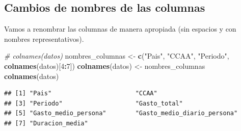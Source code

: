 \documentclass[data,article,submit,moreauthors,pdftex]{Definitions/mdpi}
\newenvironment{Shaded}{\begin{snugshade}}{\end{snugshade}}
\newcommand{\AttributeTok}[1]{\textcolor[rgb]{0.13,0.29,0.53}{#1}}
\newcommand{\CommentTok}[1]{\textcolor[rgb]{0.56,0.35,0.01}{\textit{#1}}}
\newcommand{\DecValTok}[1]{\textcolor[rgb]{0.00,0.00,0.81}{#1}}
\newcommand{\FunctionTok}[1]{\textcolor[rgb]{0.13,0.29,0.53}{\textbf{#1}}}
\newcommand{\NormalTok}[1]{#1}
\newcommand{\OtherTok}[1]{\textcolor[rgb]{0.56,0.35,0.01}{#1}}
\newcommand{\SpecialCharTok}[1]{\textcolor[rgb]{0.81,0.36,0.00}{\textbf{#1}}}
\newcommand{\StringTok}[1]{\textcolor[rgb]{0.31,0.60,0.02}{#1}}
\begin{document}
\begin{Shaded}
\end{Shaded}

\subsection{Cambios de nombres de las
columnas}\label{cambios-de-nombres-de-las-columnas}

Vamos a renombrar las columnas de manera apropiada (sin espacios y con
nombres representativos).

\begin{Shaded}
\begin{Highlighting}[]
\CommentTok{\# colnames(datos)}
\NormalTok{nombres\_columnas }\OtherTok{\textless{}{-}} \FunctionTok{c}\NormalTok{(}\StringTok{"Pais"}\NormalTok{, }\StringTok{"CCAA"}\NormalTok{, }\StringTok{"Periodo"}\NormalTok{, }\FunctionTok{colnames}\NormalTok{(datos)[}\DecValTok{4}\SpecialCharTok{:}\DecValTok{7}\NormalTok{])}
\FunctionTok{colnames}\NormalTok{(datos) }\OtherTok{\textless{}{-}}\NormalTok{ nombres\_columnas}
\FunctionTok{colnames}\NormalTok{(datos)}
\end{Highlighting}
\end{Shaded}

\begin{verbatim}
## [1] "Pais"                       "CCAA"                      
## [3] "Periodo"                    "Gasto_total"               
## [5] "Gasto_medio_persona"        "Gasto_medio_diario_persona"
## [7] "Duracion_media"
\end{verbatim}
\end{document}
